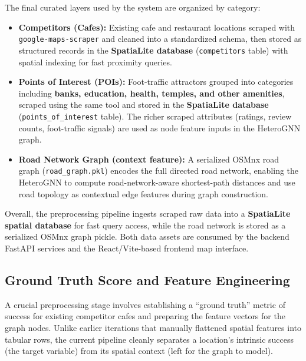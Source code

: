 The final curated layers used by the system are organized by category:
\begin{itemize}
    \item \textbf{Competitors (Cafes):} Existing cafe and restaurant locations scraped with \texttt{google\allowbreak-\allowbreak maps\allowbreak-\allowbreak scraper} and cleaned into a standardized schema, then stored as structured records in the \textbf{SpatiaLite database} (\texttt{competitors} table) with spatial indexing for fast proximity queries.
    \item \textbf{Points of Interest (POIs):} Foot-traffic attractors grouped into categories including \textbf{banks, education, health, temples, and other amenities}, scraped using the same tool and stored in the \textbf{SpatiaLite database} (\texttt{points\allowbreak\_\allowbreak of\allowbreak\_\allowbreak interest} table). The richer scraped attributes (ratings, review counts, foot-traffic signals) are used as node feature inputs in the HeteroGNN graph.
    \item \textbf{Road Network Graph (context feature):} A serialized OSMnx road graph (\texttt{road\_graph.pkl}) encodes the full directed road network, enabling the HeteroGNN to compute road-network-aware shortest-path distances and use road topology as contextual edge features during graph construction.

\end{itemize}

\noindent Overall, the preprocessing pipeline ingests scraped raw data into a \textbf{SpatiaLite spatial database} for fast query access, while the road network is stored as a serialized OSMnx graph pickle. Both data assets are consumed by the backend FastAPI services and the React/Vite-based frontend map interface.
\subsection{Ground Truth Score and Feature Engineering}

A crucial preprocessing stage involves establishing a ``ground truth'' metric of success for existing competitor cafes and preparing the feature vectors for the graph nodes. Unlike earlier iterations that manually flattened spatial features into tabular rows, the current pipeline cleanly separates a location's intrinsic success (the target variable) from its spatial context (left for the graph to model).

